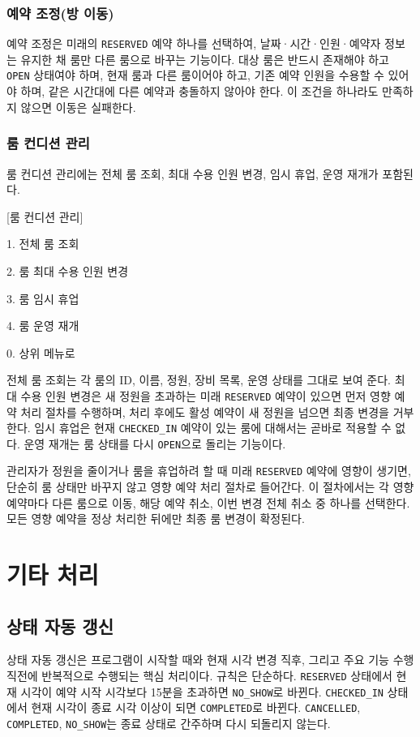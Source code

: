\documentclass[a4paper,10pt]{article}
\begin{document}
\subsubsection{예약 조정(방 이동)}
예약 조정은 미래의 \texttt{RESERVED} 예약 하나를 선택하여, 날짜·시간·인원·예약자 정보는 유지한 채 룸만 다른 룸으로 바꾸는 기능이다. 대상 룸은 반드시 존재해야 하고 \texttt{OPEN} 상태여야 하며, 현재 룸과 다른 룸이어야 하고, 기존 예약 인원을 수용할 수 있어야 하며, 같은 시간대에 다른 예약과 충돌하지 않아야 한다. 이 조건을 하나라도 만족하지 않으면 이동은 실패한다.

\subsubsection{룸 컨디션 관리}
룸 컨디션 관리에는 전체 룸 조회, 최대 수용 인원 변경, 임시 휴업, 운영 재개가 포함된다.

\begin{menubox}
\small
[룸 컨디션 관리]\par
1. 전체 룸 조회\par
2. 룸 최대 수용 인원 변경\par
3. 룸 임시 휴업\par
4. 룸 운영 재개\par
0. 상위 메뉴로
\end{menubox}

전체 룸 조회는 각 룸의 ID, 이름, 정원, 장비 목록, 운영 상태를 그대로 보여 준다. 최대 수용 인원 변경은 새 정원을 초과하는 미래 \texttt{RESERVED} 예약이 있으면 먼저 영향 예약 처리 절차를 수행하며, 처리 후에도 활성 예약이 새 정원을 넘으면 최종 변경을 거부한다. 임시 휴업은 현재 \texttt{CHECKED\_IN} 예약이 있는 룸에 대해서는 곧바로 적용할 수 없다. 운영 재개는 룸 상태를 다시 \texttt{OPEN}으로 돌리는 기능이다.

관리자가 정원을 줄이거나 룸을 휴업하려 할 때 미래 \texttt{RESERVED} 예약에 영향이 생기면, 단순히 룸 상태만 바꾸지 않고 영향 예약 처리 절차로 들어간다. 이 절차에서는 각 영향 예약마다 다른 룸으로 이동, 해당 예약 취소, 이번 변경 전체 취소 중 하나를 선택한다. 모든 영향 예약을 정상 처리한 뒤에만 최종 룸 변경이 확정된다.

\section{기타 처리}

\subsection{상태 자동 갱신}
상태 자동 갱신은 프로그램이 시작할 때와 현재 시각 변경 직후, 그리고 주요 기능 수행 직전에 반복적으로 수행되는 핵심 처리이다. 규칙은 단순하다. \texttt{RESERVED} 상태에서 현재 시각이 예약 시작 시각보다 15분을 초과하면 \texttt{NO\_SHOW}로 바뀐다. \texttt{CHECKED\_IN} 상태에서 현재 시각이 종료 시각 이상이 되면 \texttt{COMPLETED}로 바뀐다. \texttt{CANCELLED}, \texttt{COMPLETED}, \texttt{NO\_SHOW}는 종료 상태로 간주하며 다시 되돌리지 않는다.
\end{document}
